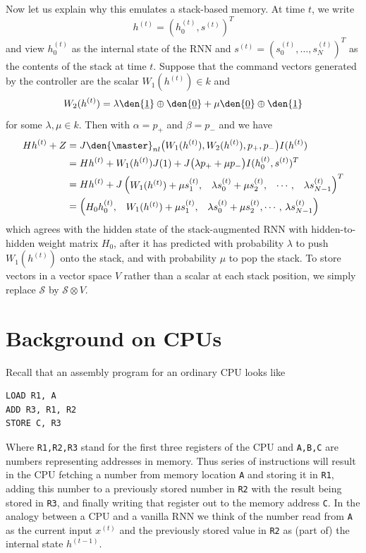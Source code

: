 \begin{example}
Now let us explain why this emulates a stack-based memory. At time $t$, we write
\[
h^{(t)} = (h_0^{(t)}, s^{(t)})^T
\]
and view $h_0^{(t)}$ as the internal state of the RNN and $s^{(t)} = (s_0^{(t)}, \ldots, s_N^{(t)})^T$ as the contents of the stack at time $t$. Suppose that the command vectors generated by the controller are the scalar $W_1(h^{(t)}) \in k$ and
\[
W_2(h^{(t)}) = \lambda \den{\underline{1}} \oplus \den{\underline{0}} + \mu \den{\underline{0}} \oplus \den{\underline{1}}
\]
for some $\lambda,\mu \in k$.
Then with $\alpha = p_{+}$ and $\beta = p_{-}$ and  we have
\begin{align*}
H h^{(t)} + Z &= J\den{\master}_{nl}\big( W_1(h^{(t)}), W_2(h^{(t)}), p_+, p_-\big)I( h^{(t)} )\\
&= H h^{(t)} + W_1(h^{(t)}) J(1) + J\big( \lambda p_+ + \mu p_{-} \big)I( h_0^{(t)}, s^{(t)})^T\\
&= H h^{(t)} + J\begin{pmatrix} W_1(h^{(t)}) + \mu s_1^{(t)}, & \lambda s_0^{(t)} + \mu s_2^{(t)}, & \cdots, & \lambda s_{N-1}^{(t)} \end{pmatrix}^T\\
&= \begin{pmatrix}
H_0 h_0^{(t)}, &
W_1(h^{(t)}) + \mu s_1^{(t)}, & 
\lambda s_0^{(t)} + \mu s_2^{(t)},
\cdots,\,
\lambda s_{N-1}^{(t)}
\end{pmatrix}
\end{align*}
which agrees with the hidden state of the stack-augmented RNN \cite{joulin} with hidden-to-hidden weight matrix $H_0$, after it has predicted with probability $\lambda$ to push $W_1(h^{(t)})$ onto the stack, and with probability $\mu$ to pop the stack. To store vectors in a vector space $V$ rather than a scalar at each stack position, we simply replace $\mathscr{S}$ by $\mathscr{S} \otimes V$.
\end{example}

\section{Background on CPUs}\label{section:appendix_cpu}

Recall that an assembly program for an ordinary CPU looks like
\begin{verbatim}
LOAD R1, A
ADD R3, R1, R2
STORE C, R3
\end{verbatim}
Where \verb+R1,R2,R3+ stand for the first three registers of the CPU and \verb+A,B,C+ are numbers representing addresses in memory. Thus series of instructions will result in the CPU fetching a number from memory location \verb+A+ and storing it in \verb+R1+, adding this number to a previously stored number in \verb+R2+ with the result being stored in \verb+R3+, and finally writing that register out to the memory address \verb+C+. In the analogy between a CPU and a vanilla RNN we think of the number read from \verb+A+ as the current input $x^{(t)}$ and the previously stored value in \verb+R2+ as (part of) the internal state $h^{(t-1)}$.

